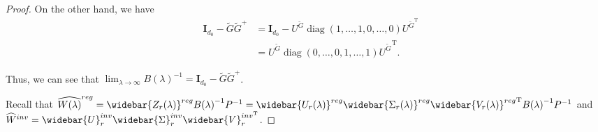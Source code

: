 \documentclass{article}
\newcommand{\T}{\mathrm{T}}
\theoremstyle{plain}
\theoremstyle{definition}
\theoremstyle{remark}
\theoremstyle{remark}
\begin{document}
\begin{proof}
      On the other hand, we have 
      \begin{align*}
        \quad \mathbf{I}_{d_0}-\widetilde{G}\widetilde{G}^{+} &= \mathbf{I}_{d_0} - U^{\widetilde{G}} \operatorname*{diag}(1, \dots, 1, 0, \dots, 0) U^{\widetilde{G}^{\T}} \\
        &= U^{\widetilde{G}} \operatorname*{diag}(0, \dots, 0,  1, \dots, 1) {U^{\widetilde{G}}}^{\T}.
      \end{align*}

      Thus, we can see that $\lim_{\lambda \rightarrow \infty} {B(\lambda)}^{-1} = \mathbf{I}_{d_0}-\widetilde{G}\widetilde{G}^{+}$.

      Recall that $\widehat{W(\lambda)}^{reg} = \widebar{Z_r(\lambda)}^{reg} {B(\lambda)}^{-1} P^{-1} = \widebar{U_r(\lambda)}^{reg} \widebar{\Sigma_r(\lambda)}^{reg} {{\widebar{V_r(\lambda)}}^{reg}}^{\T} {B(\lambda)}^{-1} P^{-1}$ and $\widehat{W}^{inv} = \widebar{U}^{inv}_r \widebar{\Sigma}^{inv}_r \widebar {V}_{r}^{inv^{\T}}$.


\end{proof}
\end{document}
